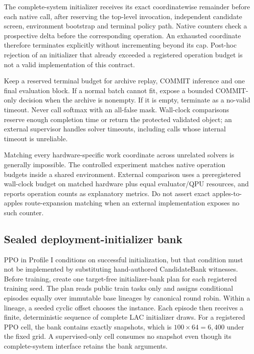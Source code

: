 The complete-system initializer receives its exact coordinatewise remainder before each native call, after reserving the top-level invocation, independent candidate screen, environment bootstrap and terminal policy path. Native counters check a prospective delta before the corresponding operation. An exhausted coordinate therefore terminates explicitly without incrementing beyond its cap. Post-hoc rejection of an initializer that already exceeded a registered operation budget is not a valid implementation of this contract.

Keep a reserved terminal budget for archive replay, COMMIT inference and one final evaluation block. If a normal batch cannot fit, expose a bounded COMMIT-only decision when the archive is nonempty. If it is empty, terminate as a no-valid timeout. Never call softmax with an all-false mask. Wall-clock comparisons reserve enough completion time or return the protected validated object; an external supervisor handles solver timeouts, including calls whose internal timeout is unreliable.

Matching every hardware-specific work coordinate across unrelated solvers is generally impossible. The controlled experiment matches native operation budgets inside a shared environment. External comparison uses a preregistered wall-clock budget on matched hardware plus equal evaluator/QPU resources, and reports operation counts as explanatory metrics. Do not assert exact apples-to-apples route-expansion matching when an external implementation exposes no such counter.

\subsection{Sealed deployment-initializer bank}
PPO in Profile I conditions on successful initialization, but that condition must not be implemented by substituting hand-authored CandidateBank witnesses. Before training, create one target-free initializer-bank plan for each registered training seed. The plan reads public train tasks only and assigns conditional episodes equally over immutable base lineages by canonical round robin. Within a lineage, a seeded cyclic offset chooses the instance. Each episode then receives a finite, deterministic sequence of complete LAC initializer draws. For a registered PPO cell, the bank contains exactly  snapshots, which is $100\times64=6{,}400$ under the fixed grid. A supervised-only cell consumes no snapshot even though its complete-system interface retains the bank arguments.

